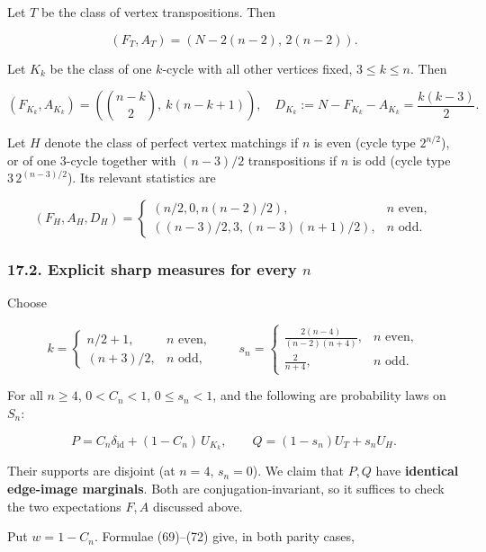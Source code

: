 \documentclass[
  11pt,
]{article}
\begin{document}
Let \(T\) be the class of vertex transpositions. Then

\[
(F_T,A_T)=(N-2(n-2),\,2(n-2)). \tag{69}
\]

Let \(K_k\) be the class of one \(k\)-cycle with all other vertices
fixed, \(3\le k\le n\). Then

\[
(F_{K_k},A_{K_k})
=\left(\binom{n-k}{2},\ k(n-k+1)\right),\quad
D_{K_k}:=N-F_{K_k}-A_{K_k}=\frac{k(k-3)}2. \tag{70}
\]

Let \(H\) denote the class of perfect vertex matchings if \(n\) is even
(cycle type \(2^{n/2}\)), or of one 3-cycle together with \((n-3)/2\)
transpositions if \(n\) is odd (cycle type \(3\,2^{(n-3)/2}\)). Its
relevant statistics are

\[
(F_H,A_H,D_H)=
\begin{cases}
\left(n/2,0,n(n-2)/2\right),&n\text{ even},\\[2pt]
\left((n-3)/2,3,(n-3)(n+1)/2\right),&n\text{ odd}.
\end{cases} \tag{71}
\]

\subsubsection{\texorpdfstring{17.2. Explicit sharp measures for every
\(n\)}{17.2. Explicit sharp measures for every n}}\label{explicit-sharp-measures-for-every-n}

Choose

\[
k=\begin{cases}
n/2+1,&n\text{ even},\\
(n+3)/2,&n\text{ odd},
\end{cases}
\qquad
s_n=\begin{cases}
\displaystyle\frac{2(n-4)}{(n-2)(n+4)},&n\text{ even},\\[5pt]
\displaystyle\frac2{n+4},&n\text{ odd}.
\end{cases} \tag{72}
\]

For all \(n\ge4\), \(0<C_n<1\), \(0\le s_n<1\), and the following are
probability laws on \(S_n\):

\[
P=C_n\delta_{\mathrm{id}}+(1-C_n)\,U_{K_k},
\qquad
Q=(1-s_n)U_T+s_n U_H. \tag{73}
\]

Their supports are disjoint (at \(n=4\), \(s_n=0\)). We claim that
\(P,Q\) have \textbf{identical edge-image marginals}. Both are
conjugation-invariant, so it suffices to check the two expectations
\(F,A\) discussed above.

Put \(w=1-C_n\). Formulae (69)--(72) give, in both parity cases,
\end{document}
